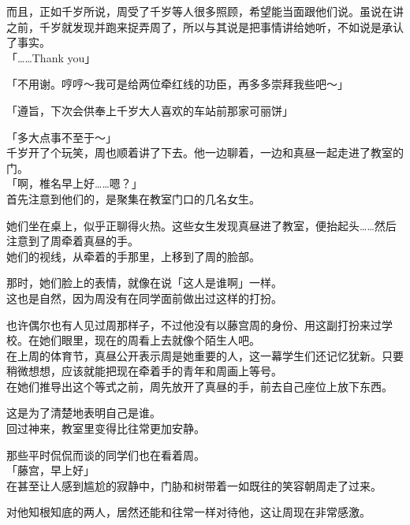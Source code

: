 而且，正如千岁所说，周受了千岁等人很多照顾，希望能当面跟他们说。虽说在讲之前，千岁就发现并跑来捉弄周了，所以与其说是把事情讲给她听，不如说是承认了事实。\\

「……Thank you」

「不用谢。哼哼～我可是给两位牵红线的功臣，再多多崇拜我些吧～」

「遵旨，下次会供奉上千岁大人喜欢的车站前那家可丽饼」

「多大点事不至于～」\\

千岁开了个玩笑，周也顺着讲了下去。他一边聊着，一边和真昼一起走进了教室的门。\\

「啊，椎名早上好……嗯？」\\

首先注意到他们的，是聚集在教室门口的几名女生。

她们坐在桌上，似乎正聊得火热。这些女生发现真昼进了教室，便抬起头……然后注意到了周牵着真昼的手。\\

她们的视线，从牵着的手那里，上移到了周的脸部。

那时，她们脸上的表情，就像在说「这人是谁啊」一样。\\

这也是自然，因为周没有在同学面前做出过这样的打扮。

也许偶尔也有人见过周那样子，不过他没有以藤宫周的身份、用这副打扮来过学校。在她们眼里，现在的周看上去就像个陌生人吧。\\

在上周的体育节，真昼公开表示周是她重要的人，这一幕学生们还记忆犹新。只要稍微想想，应该就能把现在牵着手的青年和周画上等号。\\

在她们推导出这个等式之前，周先放开了真昼的手，前去自己座位上放下东西。

这是为了清楚地表明自己是谁。\\

回过神来，教室里变得比往常更加安静。

那些平时侃侃而谈的同学们也在看着周。\\

「藤宫，早上好」\\

在甚至让人感到尴尬的寂静中，门胁和树带着一如既往的笑容朝周走了过来。

对他知根知底的两人，居然还能和往常一样对待他，这让周现在非常感激。\\

